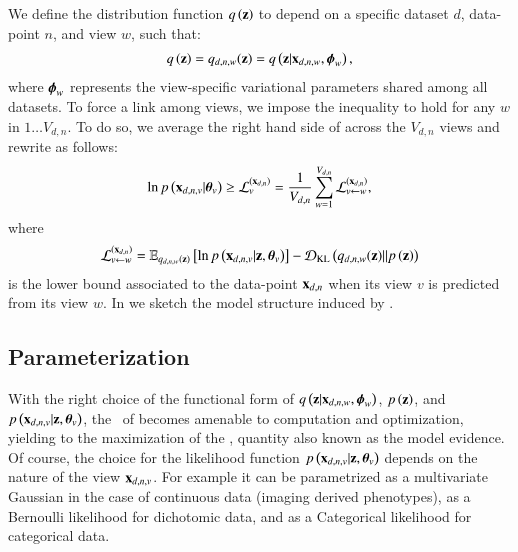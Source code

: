 We define the distribution function $q\left(\mathbf{z}\right)$ to depend on a specific dataset $d$, data-point $n$, and view $w$, such that:
\begin{equation}\label{eq:q}
\begin{aligned}
q\left(\mathbf{z}\right) = q_{d,n,w}(\mathbf{z}) = q\left(\mathbf{z}|\mathbf{x}_{d,n,w}, \boldsymbol{\phi}_w\right),
\end{aligned}
\end{equation}
where $\boldsymbol{\phi}_w$ represents the view-specific variational parameters shared among all datasets.
To force a link among views, we impose the inequality  to hold for any $w$ in $1 \ldots V_{d,n}$.
To do so, we average the right hand side of  across the $V_{d,n}$ views and rewrite  as follows:
\begin{equation}\label{eq:newLB}
\begin{aligned}
\ln p\left(\mathbf{x}_{d,n,v}|\boldsymbol{\theta}_v\right) \geq \mathcal{L}_v^{(\mathbf{x}_{d,n})} = \frac{1}{V_{d,n}} \sum_{w=1}^{V_{d,n}} \mathcal{L}_{v \leftarrow w}^{(\mathbf{x}_{d,n})},
\end{aligned}
\end{equation}
where
\begin{equation}\label{eq:LBdnvw}
\begin{aligned}
\mathcal{L}_{v \leftarrow w}^{(\mathbf{x}_{d,n})} = \operatorname{\mathbb{E}}_{q_{d,n,w}(\mathbf{z})}\left[\ln p\left(\mathbf{x}_{d,n,v}|\mathbf{z}, \boldsymbol{\theta}_v\right)\right] - \operatorname{\mathcal{D}_{KL}}\left(q_{d,n,w}(\mathbf{z})||p\left(\mathbf{z}\right)\right)
\end{aligned}
\end{equation}
is the lower bound associated to the data-point $\mathbf{x}_{d,n}$ when its view $v$ is predicted from its view $w$.
In  we sketch the model structure induced by .



\subsection{Parameterization}
\label{ssec:parameterization}

With the right choice of the functional form of $q\left(\mathbf{z}|\mathbf{x}_{d,n,w}, \boldsymbol{\phi}_w\right)$, $p\left(\mathbf{z}\right)$, and $p\left(\mathbf{x}_{d,n,v}|\mathbf{z}, \boldsymbol{\theta}_v\right)$, the \rhs\ of  becomes amenable to computation and optimization, yielding to the maximization of the \lhs, quantity also known as the model evidence.
Of course, the choice for the likelihood function $p\left(\mathbf{x}_{d,n,v}|\mathbf{z}, \boldsymbol{\theta}_v\right)$ depends on the nature of the view $\mathbf{x}_{d,n,v}$.
For example it can be parametrized as a multivariate Gaussian in the case of continuous data (\ie imaging derived phenotypes), as a Bernoulli likelihood for dichotomic data, and as a Categorical likelihood for categorical data.

